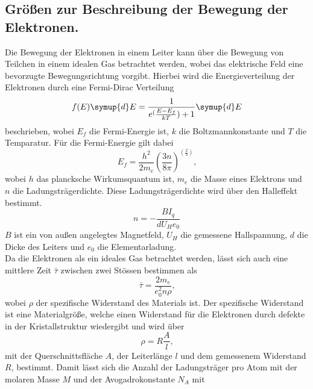 \subsection{Größen zur Beschreibung der Bewegung der Elektronen.}

\noindent Die Bewegung der Elektronen in einem Leiter kann über die Bewegung von Teilchen in einem idealen Gas betrachtet
werden, wobei das elektrische Feld eine bevorzugte Bewegungsrichtung vorgibt. Hierbei wird die Energieverteilung
der Elektronen durch eine Fermi-Dirac Verteilung
    \begin{equation}
         f(E)\symup{d}E=\frac{1}{e^(\frac{E-E_f}{kT})+1}\symup{d}E
         \label{eqn:fermidirac}
    \end{equation}   
\noindent beschrieben, wobei $E_f$ die Fermi-Energie ist, $k$ die Boltzmannkonstante und $T$ die Temparatur. Für die 
Fermi-Energie gilt dabei
\begin{equation}
    E_f=\frac{h^2}{2m_e}(\frac{3n}{8\pi})^(\frac{2}{3}) \text{,}
    \label{eqn:fermienergie}
\end{equation}
\noindent wobei $h$ das plancksche Wirkumsquantum ist, $m_e$ die Masse eines Elektrons und $n$ die Ladungsträgerdichte.
Diese Ladungsträgerdichte wird über den Halleffekt bestimmt.
\begin{equation}
    n=-\frac{BI_q}{dU_He_0}
    \label{eqn:ladungsdichte}
\end{equation}
\noindent $B$ ist ein von außen angelegtes Magnetfeld, $U_H$ die gemessene Hallspannung, $d$ die Dicke des Leiters und $e_0$
die Elementarladung.\\
\noindent Da die Elektronen als ein ideales Gas betrachtet werden, lässt sich auch eine mittlere Zeit $\bar{\tau}$ 
zwischen zwei Stössen bestimmen als
\begin{equation}
    \bar{\tau}=\frac{2m_e}{e_0^2n\rho}\text{,}
    \label{eqn:mittlere Flugdauer}
\end{equation}
\noindent wobei $\rho$ der spezifische Widerstand des Materials ist. Der spezifische Widerstand ist eine Materialgröße,
welche einen Widerstand für die Elektronen durch defekte in der Kristallstruktur wiedergibt und wird über
\begin{equation}
    \rho=R\frac{A}{l}
    \label{eqn:spezifischer_widerstand}\text{,}
\end{equation}
\noindent mit der Querschnittsfläche $A$, der Leiterlänge $l$ und dem gemessenem Widerstand $R$, bestimmt.
Damit lässt sich die Anzahl der Ladungsträger pro Atom mit der molaren Masse $M$ und der Avogadrokonstante $N_A$ mit
